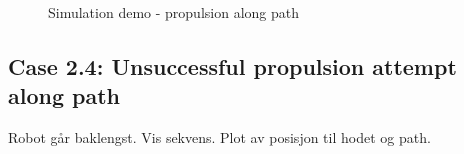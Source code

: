 \begin{figure}
    \caption{Simulation demo - propulsion along path}
    \label{fig:case2-3}
\end{figure}


\subsection{Case 2.4: Unsuccessful propulsion attempt along path}
Robot går baklengst.
Vis sekvens. Plot av posisjon til hodet og path.


